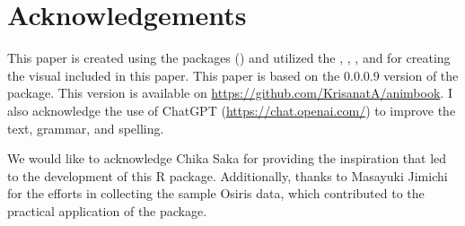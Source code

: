 \section*{Acknowledgements}\label{acknowledgements}

This paper is created using the  packages (\citet{rjtools}) and utilized the , , , and  for creating the visual included in this paper. This paper is based on the 0.0.0.9 version of the  package. This version is available on \url{https://github.com/KrisanatA/animbook}.
I also acknowledge the use of ChatGPT (\url{https://chat.openai.com/}) to improve the text, grammar, and spelling.

We would like to acknowledge Chika Saka for providing the inspiration that led to the development of this R package. Additionally, thanks to Masayuki Jimichi for the efforts in collecting the sample Osiris data, which contributed to the practical application of the package.



\address{%
Krisanat Anukarnsakulchularp\\
Monash University\\%
Department of Econometrics and Business Statistics\\ Melbourne, Australia\\
%
%
\textit{ORCiD: \href{https://orcid.org/0009-0008-5638-7124}{0009-0008-5638-7124}}\\%
\href{mailto:kanu0003@student.monash.edu}{\nolinkurl{kanu0003@student.monash.edu}}%
}

\address{%
Dianne Cook\\
Monash University\\%
Department of Econometrics and Business Statistics\\ Melbourne, Australia\\
%
%
\textit{ORCiD: \href{https://orcid.org/0000-0002-3813-7155}{0000-0002-3813-7155}}\\%
\href{mailto:dicook@monash.edu}{\nolinkurl{dicook@monash.edu}}%
}
